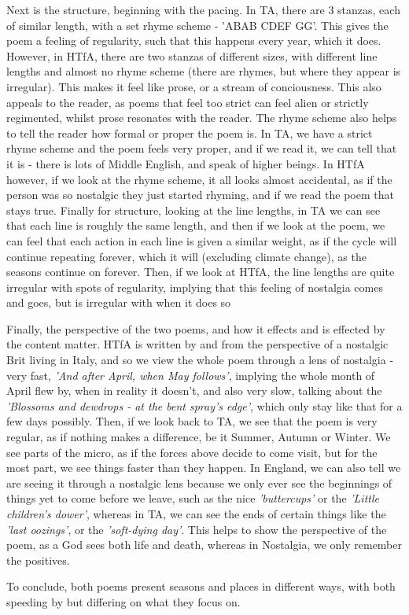 \documentclass[12pt, oneside]{article}
\begin{document}
Next is the structure, beginning with the pacing. In TA, there are 3 stanzas, each of similar length, with a set rhyme scheme - 'ABAB CDEF GG'. This gives the poem a feeling of regularity, such that this happens every year, which it does. However, in HTfA, there are two stanzas of different sizes, with different line lengths and almost no rhyme scheme (there are rhymes, but where they appear is irregular). This makes it feel like prose, or a stream of conciousness. This also appeals to the reader, as poems that feel too strict can feel alien or strictly regimented, whilst prose resonates with the reader. The rhyme scheme also helps to tell the reader how formal or proper the poem is. In TA, we have a strict rhyme scheme and the poem feels very proper, and if we read it, we can tell that it is - there is lots of Middle English, and speak of higher beings. In HTfA however, if we look at the rhyme scheme, it all looks almost accidental, as if the person was so nostalgic they just started rhyming, and if we read the poem that stays true. Finally for structure, looking at the line lengths, in TA we can see that each line is roughly the same length, and then if we look at the poem, we can feel that each action in each line is given a similar weight, as if the cycle will continue repeating forever, which it will (excluding climate change), as the seasons continue on forever. Then, if we look at HTfA, the line lengths are quite irregular with spots of regularity, implying that this feeling of nostalgia comes and goes, but is irregular with when it does so
\par
\bigskip



Finally, the perspective of the two poems, and how it effects and is effected by the content matter. HTfA is written by and from the perspective of a nostalgic Brit living in Italy, and so we view the whole poem through a lens of nostalgia - very fast, \textit{'And after April, when May follows'}, implying the whole month of April flew by, when in reality it doesn't, and also very slow, talking about the \textit{'Blossoms and dewdrops - at the bent spray's edge'}, which only stay like that for a few days possibly. Then, if we look back to TA, we see that the poem is very regular, as if nothing makes a difference, be it Summer, Autumn or Winter. We see parts of the micro, as if the forces above decide to come visit, but for the most part, we see things faster than they happen. In England, we can also tell we are seeing it through a nostalgic lens because we only ever see the beginnings of things yet to come before we leave, such as the nice \textit{'buttercups'} or the \textit{'Little children's dower'}, whereas in TA, we can see the ends of certain things like the \textit{'last oozings'}, or the \textit{'soft-dying day'}. This helps to show the perspective of the poem, as a God sees both life and death, whereas in Nostalgia, we only remember the positives.

To conclude, both poems present seasons and places in different ways, with both speeding by but differing on what they focus on.
\end{document}
